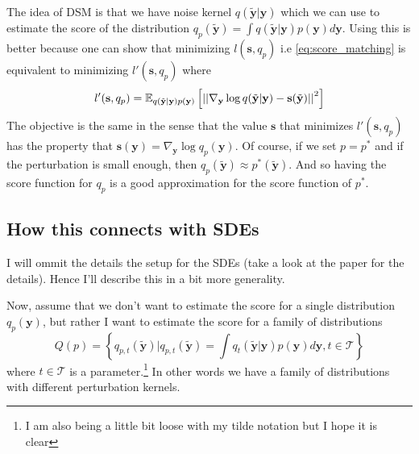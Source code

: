 The idea of DSM is that we have noise kernel $q(\tilde{\mathbf{y}}|\mathbf{y})$
which we can use to estimate the score of the distribution
$q_{p}(\tilde{\mathbf{y}}) = \int q(\tilde{\mathbf{y}}|\mathbf{y}) p(\mathbf{y}) d\mathbf{y}$.
Using this is better because one can show that minimizing $l(\mathbf{s}, q_p)$ i.e \cref{eq:score_matching}
is equivalent to minimizing $l'(\mathbf{s}, q_p)$ where
\begin{align}
    \label{eq:denoising_score_matching}
    l'(\mathbf{s}, q_p) = \mathbb{E}_{q(\tilde{\mathbf{y}}|\mathbf{y})p(\mathbf{y})} \left[ \left|\left| \nabla_{\mathbf{y}} \log q(\tilde{\mathbf{y}}|\mathbf{y}) - \mathbf{s}(\tilde{\mathbf{y}}) \right|\right|^2 \right]
\end{align}
The objective is the same in the sense that the value $\mathbf{s}$ that minimizes $l'(\mathbf{s}, q_p)$
has the property that $\mathbf{s}(\mathbf{y}) = \nabla_{\mathbf{y}} \log q_p(\mathbf{y})$.
Of course, if we set $p = p^*$ and if the perturbation is small enough, then $q_p(\tilde{\mathbf{y}}) \approx p^*(\tilde{\mathbf{y}})$.
And so having the score function for $q_p$ is a good approximation for the score function of $p^*$.


\subsection{How this connects with SDEs}
I will ommit the details the setup for the SDEs (take a look at the paper for the details).
Hence I'll describe this in a bit more generality.

Now, assume that we don't want to estimate the score for a single distribution $q_p(\mathbf{y})$,
but rather I want to estimate the score for a family of distributions
\[ Q(p)  = \left\{ q_{p,t}(\tilde{\mathbf{y}}) | q_{p,t}(\tilde{\mathbf{y}}) = \int q_t(\tilde{\mathbf{y}}| \mathbf{y}) p(\mathbf{y}) d\mathbf{y}, t \in \mathcal{T}\right\} \]
where $t \in \mathcal{T}$ is a parameter.\footnote{I am also being a little bit loose with my tilde notation but I hope it is clear}
In other words we have a family of distributions with different perturbation kernels.

